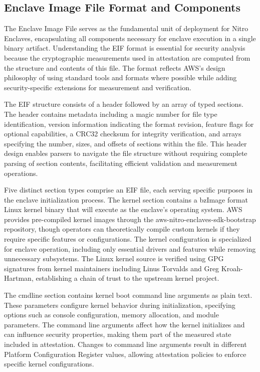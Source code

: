 \subsection{Enclave Image File Format and Components}

The Enclave Image File serves as the fundamental unit of deployment for Nitro Enclaves, encapsulating all components necessary for enclave execution in a single binary artifact. Understanding the EIF format is essential for security analysis because the cryptographic measurements used in attestation are computed from the structure and contents of this file. The format reflects AWS's design philosophy of using standard tools and formats where possible while adding security-specific extensions for measurement and verification.

The EIF structure consists of a header followed by an array of typed sections. The header contains metadata including a magic number for file type identification, version information indicating the format revision, feature flags for optional capabilities, a CRC32 checksum for integrity verification, and arrays specifying the number, sizes, and offsets of sections within the file. This header design enables parsers to navigate the file structure without requiring complete parsing of section contents, facilitating efficient validation and measurement operations.

Five distinct section types comprise an EIF file, each serving specific purposes in the enclave initialization process. The kernel section contains a bzImage format Linux kernel binary that will execute as the enclave's operating system. AWS provides pre-compiled kernel images through the aws-nitro-enclaves-sdk-bootstrap repository, though operators can theoretically compile custom kernels if they require specific features or configurations. The kernel configuration is specialized for enclave operation, including only essential drivers and features while removing unnecessary subsystems. The Linux kernel source is verified using GPG signatures from kernel maintainers including Linus Torvalds and Greg Kroah-Hartman, establishing a chain of trust to the upstream kernel project.

The cmdline section contains kernel boot command line arguments as plain text. These parameters configure kernel behavior during initialization, specifying options such as console configuration, memory allocation, and module parameters. The command line arguments affect how the kernel initializes and can influence security properties, making them part of the measured state included in attestation. Changes to command line arguments result in different Platform Configuration Register values, allowing attestation policies to enforce specific kernel configurations.

